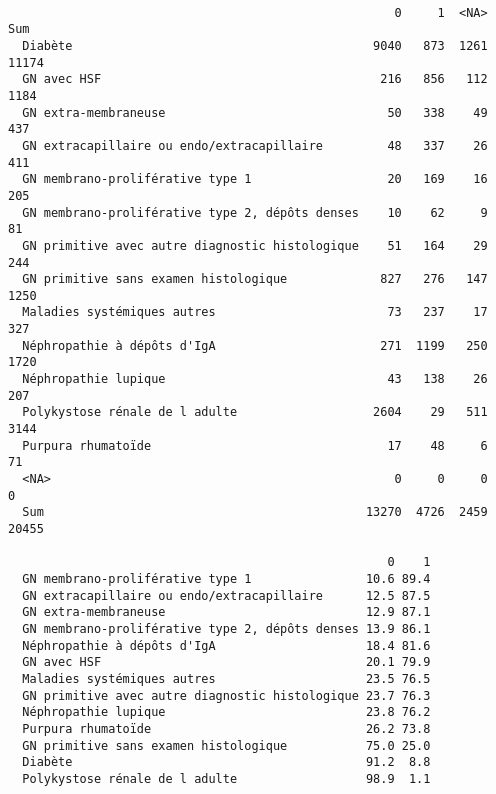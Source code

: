 \documentclass[11pt,a4paper]{article}\usepackage[]{graphicx}\usepackage[]{color}
\makeatletter
\newenvironment{kframe}{%
 \def\at@end@of@kframe{}%
 \ifinner\ifhmode%
  \def\at@end@of@kframe{\end{minipage}}%
  \begin{minipage}{\columnwidth}%
 \fi\fi%
 \def\FrameCommand##1{\hskip\@totalleftmargin \hskip-\fboxsep
 \colorbox{shadecolor}{##1}\hskip-\fboxsep
     \hskip-\linewidth \hskip-\@totalleftmargin \hskip\columnwidth}%
 \MakeFramed {\advance\hsize-\width
   \@totalleftmargin\z@ \linewidth\hsize
   \@setminipage}}%
 {\par\unskip\endMakeFramed%
 \at@end@of@kframe}
\newenvironment{knitrout}{}{} %
\makeatother
\begin{document}
\begin{knitrout}
\color{fgcolor}\begin{kframe}
\begin{verbatim}
                                                 
                                                      0     1  <NA>   Sum
  Diabète                                          9040   873  1261 11174
  GN avec HSF                                       216   856   112  1184
  GN extra-membraneuse                               50   338    49   437
  GN extracapillaire ou endo/extracapillaire         48   337    26   411
  GN membrano-proliférative type 1                   20   169    16   205
  GN membrano-proliférative type 2, dépôts denses    10    62     9    81
  GN primitive avec autre diagnostic histologique    51   164    29   244
  GN primitive sans examen histologique             827   276   147  1250
  Maladies systémiques autres                        73   237    17   327
  Néphropathie à dépôts d'IgA                       271  1199   250  1720
  Néphropathie lupique                               43   138    26   207
  Polykystose rénale de l adulte                   2604    29   511  3144
  Purpura rhumatoïde                                 17    48     6    71
  <NA>                                                0     0     0     0
  Sum                                             13270  4726  2459 20455
                                                 
                                                     0    1
  GN membrano-proliférative type 1                10.6 89.4
  GN extracapillaire ou endo/extracapillaire      12.5 87.5
  GN extra-membraneuse                            12.9 87.1
  GN membrano-proliférative type 2, dépôts denses 13.9 86.1
  Néphropathie à dépôts d'IgA                     18.4 81.6
  GN avec HSF                                     20.1 79.9
  Maladies systémiques autres                     23.5 76.5
  GN primitive avec autre diagnostic histologique 23.7 76.3
  Néphropathie lupique                            23.8 76.2
  Purpura rhumatoïde                              26.2 73.8
  GN primitive sans examen histologique           75.0 25.0
  Diabète                                         91.2  8.8
  Polykystose rénale de l adulte                  98.9  1.1
\end{verbatim}
\end{kframe}
\end{knitrout}
\end{document}
